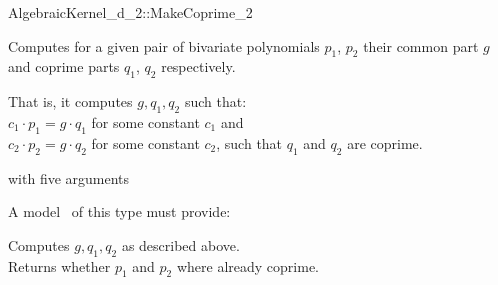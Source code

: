 \begin{ccRefFunctionObjectConcept}{AlgebraicKernel_d_2::MakeCoprime_2}

\ccDefinition
Computes for a given pair of bivariate polynomials $p_1$, $p_2$ their
common part $g$ and coprime parts $q_1$, $q_2$ respectively.

That is, it computes $g, q_1, q_2$ such that:\\
\hspace{1cm} $c_1 \cdot p_1 =  g \cdot q_1$ for some constant $c_1$ and\\
\hspace{1cm} $c_2 \cdot p_2 =  g \cdot q_2$ for some constant $c_2$, 
such that $q_1$ and $q_2$ are coprime. 

\ccRefines 
{} with five arguments 

\ccTypes

\ccOperations
{}
A model \ccVar\ of this type must provide:

{ Computes $g, q_1, q_2$ as described above.\\
Returns whether $p_1$ and $p_2$ where already coprime. 
}

\ccSeeAlso
{}\\

\end{ccRefFunctionObjectConcept}
